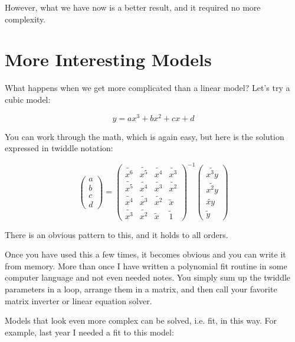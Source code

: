 \documentclass[letterpaper,12pt]{article}
\begin{document}
However, what we have now is a better result, and it required no more complexity.

\section{More Interesting Models}
What happens when we get more complicated than a linear model? Let's try a cubic model:

\begin{equation}
y=a x^3 + b x^2 + c x + d
\end{equation}

You can work through the math, which is again easy, but here is the solution expressed in twiddle notation:

\begin{equation} \label{eq.cubic.solution}
\begin{pmatrix}
a \\
b \\
c \\
d
\end{pmatrix} =
\begin{pmatrix}
\widetilde{x^6} & \widetilde{x^5} & \widetilde{x^4} & \widetilde{x^3} \\
\widetilde{x^5} & \widetilde{x^4} & \widetilde{x^3} & \widetilde{x^2} \\
\widetilde{x^4} & \widetilde{x^3} & \widetilde{x^2} & \widetilde{x} \\
\widetilde{x^3} & \widetilde{x^2} & \widetilde{x} & \widetilde{1} 
\end{pmatrix} ^{-1}
\begin{pmatrix}
\widetilde{x^3y}  \\
\widetilde{x^2y}  \\
\widetilde{xy}  \\
\widetilde{y}
\end{pmatrix}
\end{equation}

There is an obvious pattern to this, and it holds to all orders.

Once you have used this a few times, it becomes obvious and you can write it from memory. More than once I have written a polynomial fit routine in some computer language and not even needed notes. You simply sum up the twiddle parameters in a loop, arrange them in a matrix, and then call your favorite matrix inverter or linear equation solver.

Models that look even more complex can be solved, i.e. fit, in this way. For example, last year I needed a fit to this model:
\end{document}

